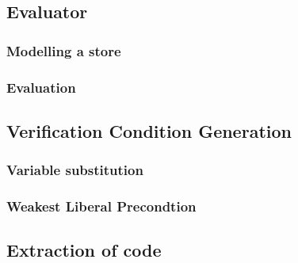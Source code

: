 \subsection{Evaluator}


\subsubsection{Modelling a store}


\subsubsection{Evaluation}


\subsection{Verification Condition Generation}


\subsubsection{Variable substitution}


\subsubsection{Weakest Liberal Precondtion}


\subsection{Extraction of code}


